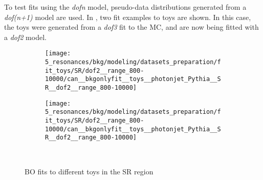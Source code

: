 To test fits using the \textit{dofn} model, pseudo-data distributions generated from a \textit{dof(n+1)} model are used. In \Fig{\ref{fig:bkg:modeling:preparation:toys:bkgonly_examples_toys_fits}}, two fit examples to toys are shown. In this case, the toys were generated from a \textit{dof3} fit to the MC, and are now being fitted with a \textit{dof2} model.

\begin{figure}[ht!]
    \centering
    \begin{subfigure}[h]{0.49\linewidth}
        \centering
        \texttt{[image: 5\_resonances/bkg/modeling/datasets\_preparation/fit\_toys/SR/dof2\_\_range\_800-10000/can\_\_bkgonlyfit\_\_toys\_\_photonjet\_Pythia\_\_SR\_\_dof2\_\_range\_800-10000]}
    \end{subfigure}
    \hfill
    \begin{subfigure}[h]{0.49\linewidth}
        \centering
        \texttt{[image: 5\_resonances/bkg/modeling/datasets\_preparation/fit\_toys/SR/dof2\_\_range\_800-10000/can\_\_bkgonlyfit\_\_toys\_\_photonjet\_Pythia\_\_SR\_\_dof2\_\_range\_800-10000]}
    \end{subfigure}\\
    \caption{\ac{BO} fits to different toys in the SR region}
    \label{fig:bkg:modeling:preparation:toys:bkgonly_examples_toys_fits}
\end{figure}

